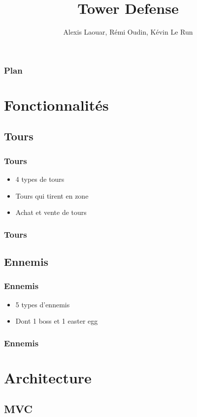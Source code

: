 \documentclass[pdf]{beamer}
\title{Tower Defense}
\author{Alexis Laouar, R\'emi Oudin, K\'evin Le Run}
\begin{document}
\begin{frame}
  \titlepage
\end{frame}

\begin{frame}
  \frametitle{Plan}
  \tableofcontents
\end{frame}

\section{Fonctionnalit\'es}

\subsection{Tours}
\begin{frame}
  \frametitle{Tours}
  \begin{itemize}
  \item 4 types de tours
  \item Tours qui tirent en zone
  \item Achat et vente de tours
  \end{itemize}
\end{frame}

\begin{frame}[fragile]
    \frametitle{Tours}
    
\end{frame}

\subsection{Ennemis}
\begin{frame}
  \frametitle{Ennemis}
  \begin{itemize}
  \item 5 types d'ennemis
  \item Dont 1 boss et 1 easter egg
  \end{itemize}
\end{frame}

\begin{frame}
    \frametitle{Ennemis}
    
\end{frame}

\section{Architecture}

\subsection{MVC}
\end{document}
